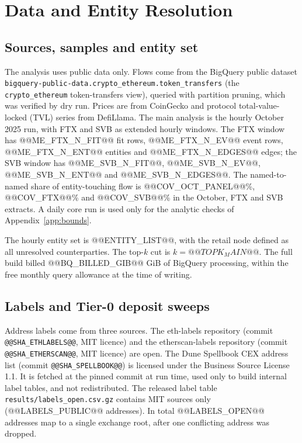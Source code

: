 \documentclass[referee,pdflatex,sn-mathphys-ay]{sn-jnl}
\theoremstyle{thmstyleone}%
\theoremstyle{thmstyletwo}%
\theoremstyle{thmstylethree}%
\begin{document}
\section{Data and Entity Resolution}
\label{sec:data}

\subsection{Sources, samples and entity set}
\label{subsec:data}
The analysis uses public data only. Flows come from the BigQuery public dataset
\texttt{bigquery-public-data.crypto\_ethereum.token\_transfers} (the \texttt{crypto\_ethereum} token-transfers view), queried with partition pruning, which was verified by dry run. Prices are from CoinGecko and protocol total-value-locked (TVL) series from DefiLlama.
The main analysis is the hourly October 2025 run, with FTX and SVB as extended hourly windows. The FTX window has
@@ME_FTX_N_FIT@@ fit rows, @@ME_FTX_N_EV@@ event rows, @@ME_FTX_N_ENT@@ entities and @@ME_FTX_N_EDGES@@ edges; the SVB window has
@@ME_SVB_N_FIT@@, @@ME_SVB_N_EV@@, @@ME_SVB_N_ENT@@ and @@ME_SVB_N_EDGES@@. The named-to-named share of entity-touching flow is
@@COV_OCT_PANEL@@\%, @@COV_FTX@@\% and @@COV_SVB@@\% in the October, FTX and SVB extracts. A daily core run is used only for the analytic checks of Appendix~\ref{app:bounds}.

The hourly entity set is @@ENTITY_LIST@@, with the retail node defined as all unresolved counterparties.
The top-$k$ cut is $k=@@TOPK_MAIN@@$. The full build billed @@BQ_BILLED_GIB@@ GiB of BigQuery processing,
within the free monthly query allowance at the time of writing.

\subsection{Labels and Tier-0 deposit sweeps}
\label{subsec:resolution}
Address labels come from three sources. The eth-labels repository (commit \texttt{@@SHA_ETHLABELS@@}, MIT
licence) and the etherscan-labels repository (commit \texttt{@@SHA_ETHERSCAN@@}, MIT licence) are open.
The Dune Spellbook CEX address list (commit \texttt{@@SHA_SPELLBOOK@@}) is licensed under the Business Source
License 1.1. It is fetched at the pinned commit at run time, used only to build internal label tables, and not
redistributed. The released label table \texttt{results/labels\_open.csv.gz} contains MIT sources only
(@@LABELS_PUBLIC@@ addresses). In total @@LABELS_OPEN@@ addresses map to a single exchange root, after one
conflicting address was dropped.
\end{document}
